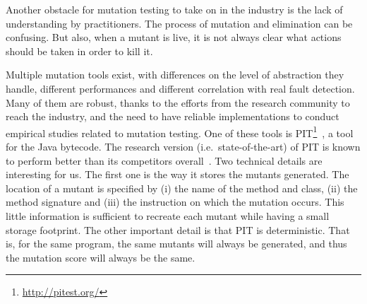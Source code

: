 \documentclass[a4paper,11pt]{sdm_internship}
\theoremstyle{definition}
\begin{document}
Another obstacle for mutation testing to take on in the industry is the lack of understanding by practitioners.
The process of mutation and elimination can be confusing.
But also, when a mutant is live, it is not always clear what actions should be taken in order to kill it.

Multiple mutation tools exist, with differences on the level of abstraction they handle, different performances and different correlation with real fault detection.
Many of them are robust, thanks to the efforts from the research community to reach the industry, and the need to have reliable implementations to conduct empirical studies related to mutation testing.
One of these tools is PIT\footnote{\url{http://pitest.org/}}~\cite{coles2016pit}, a tool for the Java bytecode.
The research version (i.e.\ state-of-the-art) of PIT is known to perform better than its competitors overall~\cite{kintis2017effective}.
Two technical details are interesting for us.
The first one is the way it stores the mutants generated.
The location of a mutant is specified by (i) the name of the method and class, (ii) the method signature and (iii) the instruction on which the mutation occurs.
This little information is sufficient to recreate each mutant while having a small storage footprint.
The other important detail is that PIT is deterministic.
That is, for the same program, the same mutants will always be generated, and thus the mutation score will always be the same.
\end{document}
